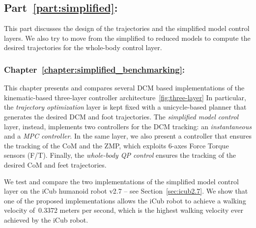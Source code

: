 \subsection{Part~\ref{part:simplified}: }

This part discusses the design of the trajectories and the simplified model control layers. We also try to move from the simplified to reduced models to compute the desired trajectories for the whole-body control layer.

\subsubsection{Chapter~\ref{chapter:simplified_benchmarking}: }

This chapter presents and compares several DCM based implementations of the kinematic-based three-layer controller architecture~\ref{fig:three-layer}
In particular, the \emph{trajectory optimization} layer is kept fixed with a unicycle-based planner that generates the desired DCM and foot trajectories. The \emph{simplified model control} layer, instead, implements two controllers for the DCM tracking: an \emph{instantaneous} and a \emph{MPC controller}. 
In the same layer, we also present a controller that ensures the tracking of the CoM and the ZMP, which exploits 6-axes Force Torque sensors (F/T).
Finally, the \emph{whole-body QP control} ensures the tracking of the desired CoM and feet trajectories. 
\par
We test and compare the two implementations of the simplified model control layer on the iCub humanoid robot v2.7 -- see Section~\ref{sec:icub2.7}. We show that one of the proposed implementations allows the iCub robot to achieve a walking velocity of~0.3372 meters per second, which is the highest walking velocity ever achieved by the iCub robot.


